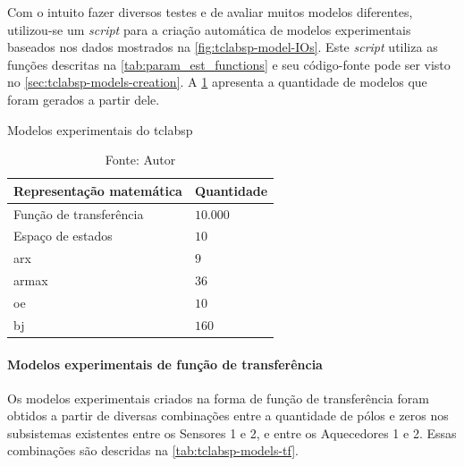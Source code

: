 Com o intuito fazer diversos testes e de avaliar muitos modelos diferentes, utilizou-se um
\textit{script} para a criação automática de modelos experimentais baseados nos dados mostrados
na \cref{fig:tclabsp-model-IOs}. Este \textit{script} utiliza as funções descritas na \cref{tab:param_est_functions}
e seu código-fonte pode ser visto no \cref{sec:tclabsp-models-creation}. 
A \cref{tab:tclabsp-models-description} apresenta a quantidade de modelos que foram gerados a partir dele.

\begin{table}[h]
	\centering
	\caption{Modelos experimentais do \acrshort{tclabsp}}
	\label{tab:tclabsp-models-description}
	\begin{tabular}{ll} \toprule
		{Representação matemática}		                                & {Quantidade}          \\ \midrule
		Função de transferência		                                    & $10.000$              \\
		Espaço de estados   		                                    & $10$                  \\
		\acrshort{arx}		                                            & $9$                   \\
		\acrshort{armax}		                                        & $36$                  \\
		\acrshort{oe}													& $10$                  \\
		\acrshort{bj}                                   				& $160$                 \\ \bottomrule
	\end{tabular}
	\caption*{Fonte: Autor}
\end{table}

\paragraph*{\textbf{Modelos experimentais de função de transferência}}
\label{par:modelos_experimentais_tf}

Os modelos experimentais criados na forma de função de transferência foram obtidos a partir de diversas combinações
entre a quantidade de pólos e zeros nos subsistemas existentes entre os Sensores 1 e 2, e entre os Aquecedores 1 e 2.
Essas combinações são descridas na \cref{tab:tclabsp-models-tf}.

